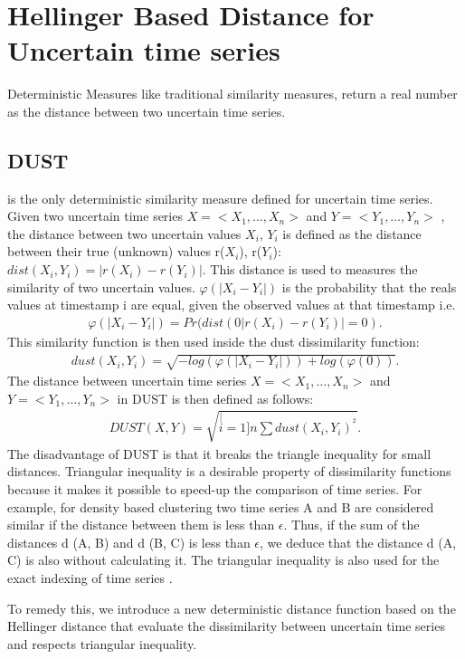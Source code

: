 \chapter{Hellinger Based Distance for Uncertain time series}

Deterministic Measures like traditional similarity measures, return a real number as
the distance between two uncertain time series. 
\section{DUST}
\cite{murthy2013generalized} is the only
deterministic similarity measure defined for uncertain time series. Given two uncertain time series $X=<X_1, \ldots,X_n>$ and $Y=<Y_1, \ldots,Y_n>$ , the distance between
two uncertain values $X_i$, $Y_i$ is defined as the distance between their true (unknown) values
r($X_i$), r($Y_i$): $dist(X_i, Y_i) = |r(X_i) - r(Y_i)|$. This distance is used to measures the
similarity of two uncertain values. $\varphi(|X_{i}-Y_{i}|)$ is the probability that the reals values at timestamp i are equal, given
the observed values at that timestamp i.e.
\begin{eqnarray}
\varphi(|X_{i}-Y_{i}|)=Pr(dist(0|r(X_{i})-r(Y_{i})|=0).
\end{eqnarray}
This similarity function is then used inside the dust dissimilarity function:
\begin{eqnarray}
dust(X_{i},Y_{i})=\sqrt{-log(\varphi(|X_{i}-Y_{i}|))+log(\varphi(0))}.
\end{eqnarray}
The distance between uncertain time series $X=<X_1, \ldots,X_n>$ and $Y=<Y_1, \ldots,Y_n>$ in DUST
is then defined as follows:
\begin{eqnarray}
DUST(X,Y)=\sqrt{\stackrel[i=1]{n}{\sum}dust(X_{i},Y_{i})^{^{2}}}.
\end{eqnarray} 
The disadvantage of DUST is that it  breaks the triangle inequality for small distances. Triangular inequality is a desirable property of dissimilarity functions because it makes it possible to speed-up the comparison of time series. For example, for density based clustering two time series A and B are considered similar if the distance between them is less than $\epsilon$. Thus, if the sum of the distances d (A, B) and d (B, C) is less than $\epsilon$, we deduce that the distance d (A, C) is also without calculating it. The triangular inequality is also used for the exact indexing of time series \cite{keogh2001locally}.


To remedy this, we introduce a new deterministic distance function based on the
Hellinger distance that evaluate the dissimilarity between uncertain time series and respects triangular
inequality.


